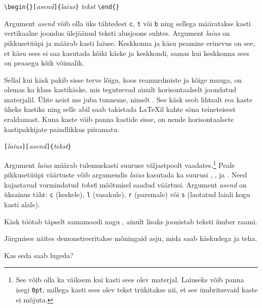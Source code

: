 \begin{lscommand}
\verb|\begin{|\verb|}[|\emph{asend}\verb|]{|\emph{laius}\verb|}|
\emph{tekst} \verb|\end{|\verb|}|
\end{lscommand}

\noindent Argument \emph{asend} võib olla üks tähtedest \texttt{c},
\texttt{t} või \texttt{b} ning sellega määratakse kasti vertikaalne
joondus ülejäänud teksti alusjoone suhtes. Argument \emph{laius} on
pikkusetüüpi ja määrab kasti laiuse. Keskkonna  ja käsu
 peamine erinevus on see, et käsu  sees ei saa
kasutada kõiki käske ja keskkondi, samas kui keskkonna 
sees on peaaegu kõik võimalik.

Sellal kui käsk  pakib sisse terve lõigu, koos reamurdmiste
ja kõige muuga, on olemas ka klass kastikäske, mis tegutsevad ainult
horisontaalselt joondatud materjalil. Ühte neist me juba tunneme, nimelt
. See käsk seob lihtsalt rea kaste üheks kastiks ning selle
abil saab takistada \LaTeX il kahte sõna teineteisest eraldamast. Kuna
kaste võib panna kastide sisse, on nende horisontaalsete kastipakkijate
paindlikkus piiramatu.

\begin{lscommand}
\verb|[|\emph{laius}\verb|][|\emph{asend}\verb|]{|\emph{tekst}\verb|}|
\end{lscommand}

\noindent Argument \emph{laius} määrab tulemuskasti suuruse
väljastpoolt vaadates.\footnote{See võib olla ka väiksem
kui kasti sees olev materjal. Laiuseks võib panna isegi \texttt{0pt},
millega kasti sees olev tekst trükitakse nii, et see ümbritsevaid kaste
ei mõjuta.} Peale pikkusetüüpi väärtuste võib argumendis \emph{laius}
kasutada ka suurusi , ,  ja
. Need kajastavad vormindatud \emph{tekst}i mõõtmisel
saadud väärtusi. Argument \emph{asend} on üksainus täht:
\texttt{c} (keskele), \texttt{l} (vasakule), \texttt{r} (paremale) või
\texttt{s} (laotatud laiali kogu kasti alale).

Käsk  töötab täpselt samamoodi nagu , ainult
lisaks joonistab teksti ümber raami.

Järgmises näites demonstreeritakse mõningaid asju, mida saab käskudega
 ja  teha.

\begin{example}
\par
{}\par
{} \par
{} \par
{}
Kas seda saab lugeda?
\end{example}

